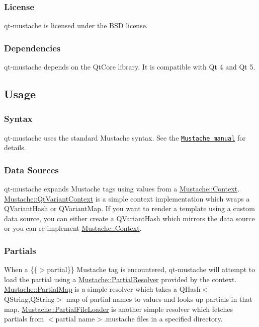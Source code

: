 \subsubsection*{License}

qt-\/mustache is licensed under the B\+S\+D license.

\subsubsection*{Dependencies}

qt-\/mustache depends on the Qt\+Core library. It is compatible with Qt 4 and Qt 5.

\subsection*{Usage}

\subsubsection*{Syntax}

qt-\/mustache uses the standard Mustache syntax. See the \href{http://mustache.github.com/mustache.5.html}{\tt Mustache manual} for details.

\subsubsection*{Data Sources}

qt-\/mustache expands Mustache tags using values from a {\ttfamily \hyperlink{classMustache_1_1Context}{Mustache\+::\+Context}}. {\ttfamily \hyperlink{classMustache_1_1QtVariantContext}{Mustache\+::\+Qt\+Variant\+Context}} is a simple context implementation which wraps a {\ttfamily Q\+Variant\+Hash} or {\ttfamily Q\+Variant\+Map}. If you want to render a template using a custom data source, you can either create a {\ttfamily Q\+Variant\+Hash} which mirrors the data source or you can re-\/implement {\ttfamily \hyperlink{classMustache_1_1Context}{Mustache\+::\+Context}}.

\subsubsection*{Partials}

When a {\ttfamily \{\{$>$partial\}\}} Mustache tag is encountered, qt-\/mustache will attempt to load the partial using a {\ttfamily \hyperlink{classMustache_1_1PartialResolver}{Mustache\+::\+Partial\+Resolver}} provided by the context. {\ttfamily \hyperlink{classMustache_1_1PartialMap}{Mustache\+::\+Partial\+Map}} is a simple resolver which takes a {\ttfamily Q\+Hash$<$Q\+String,Q\+String$>$} map of partial names to values and looks up partials in that map. {\ttfamily \hyperlink{classMustache_1_1PartialFileLoader}{Mustache\+::\+Partial\+File\+Loader}} is another simple resolver which fetches partials from {\ttfamily $<$partial name$>$.mustache} files in a specified directory.

